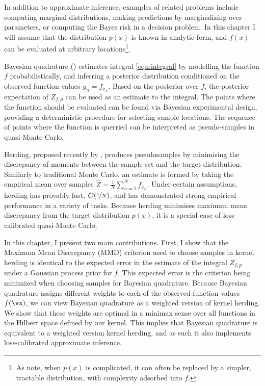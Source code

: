 In addition to approximate inference, examples of related problems include computing marginal distributions, making predictions by marginalizing over parameters, or computing the Bayes risk in a decision problem. In this chapter I will assume that the distribution $p(x)$ is known in analytic form, and $f(x)$ can be evaluated at arbitrary locations\footnote{As \citet{BZMonteCarlo} note, when $p(x)$ is complicated, it can often be replaced by a simpler, tractable distribution, with complexity adsorbed into $f$.}.

Bayesian quadrature (\bq{}) estimates integral \eqref{eqn:integral} by modelling the function $f$ probabilistically, and inferring a posterior distribution conditioned on the observed function values $y_n = f_{x_n}$. Based on the posterior over $f$, the posterior expectation of $Z_{f,p}$ can be used as an estimate to the integral. The points where the function should be evaluated can be found via Bayesian experimental design, providing a deterministic procedure for selecting sample locations. The sequence of points where the function is querried can be interpreted as pseudo-samples in quasi-Monte Carlo.

Herding, proposed recently by \cite{chen2010super}, produces pseudosamples by minimising the discrepancy of moments between the sample set and the target distribution. Similarly to traditional Monte Carlo, an estimate is formed by taking the empirical mean over samples $\hat{Z} = \frac{1}{N}\sum_{n=1}^{N}f_{x_n}$. Under certain assumptions, herding has provably fast, $\mathcal{O}(\nicefrac{1}{N})$, and has demonstrated strong empirical performance in a variety of tasks. Because herding minimises maximum mean discrepancy from the target distribution $p(x)$, it is a special case of loss-calibrated quasi-Monte Carlo.

In this chapter, I present two main contributions. First, I show that the Maximum Mean Discrepancy (MMD) criterion used to choose samples in kernel herding is identical to the expected error in the estimate of the integral $Z_{f,p}$ under a Gaussian process prior for $f$. This expected error is the criterion being minimized when choosing samples for Bayesian quadrature. Because Bayesian quadrature assigns different weights to each of the observed function values $f(\vx)$, we can view Bayesian quadrature as a weighted version of kernel herding. We show that these weights are optimal in a minimax sense over all functions in the Hilbert space defined by our kernel. This implies that Bayesian quadrature is equivalent to a weighted version kernel herding, and as such it also implements loss-calibrated approximate inference.


